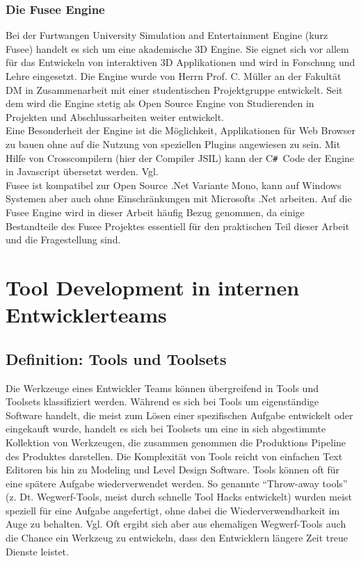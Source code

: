 \documentclass[pagesize, paper=a4, fontsize=12pt, titlepage=true, headings=small, headnosepline, abstractoff, liststotoc, nochapterprefix, plainheadsepline, twoside]{scrreprt}
\newcommand{\CSS}{C\texttt{\# }}
\begin{document}
\subsection{Die Fusee Engine}
Bei der Furtwangen University Simulation and Entertainment Engine (kurz Fusee) handelt es sich um eine akademische 3D Engine. Sie eignet sich vor allem für das Entwickeln von interaktiven 3D Applikationen und wird in Forschung und Lehre eingesetzt. Die Engine wurde von Herrn Prof. C. Müller an der Fakultät DM in Zusammenarbeit mit einer studentischen Projektgruppe entwickelt. Seit dem wird die Engine stetig als Open Source Engine von Studierenden in Projekten und Abschlussarbeiten weiter entwickelt.\\

Eine Besonderheit der Engine ist die Möglichkeit, Applikationen für Web Browser zu bauen ohne auf die Nutzung von speziellen Plugins angewiesen zu sein. Mit Hilfe von Crosscompilern (hier der Compiler JSIL) kann der \CSS Code der Engine in Javascript übersetzt werden. Vgl.  \\

Fusee ist kompatibel zur Open Source .Net Variante Mono, kann auf Windows Systemen aber auch ohne Einschränkungen mit Microsofts .Net arbeiten. Auf die Fusee Engine wird in dieser Arbeit häufig Bezug genommen, da einige Bestandteile des Fusee Projektes essentiell für den praktischen Teil dieser Arbeit und die Fragestellung sind.



\chapter{Tool Development in internen Entwicklerteams}

\section{Definition: Tools und Toolsets}
Die Werkzeuge eines Entwickler Teams können übergreifend in Tools und Toolsets klassifiziert werden. Während es sich bei Tools um eigenständige Software handelt, die meist zum Lösen einer spezifischen Aufgabe entwickelt oder eingekauft wurde, handelt es sich bei Toolsets um eine in sich abgestimmte Kollektion von Werkzeugen, die zusammen genommen die Produktions Pipeline des Produktes darstellen. Die Komplexität von Tools reicht von einfachen Text Editoren bis hin zu Modeling und Level Design Software.
Tools können oft für eine spätere Aufgabe wiederverwendet werden. So genannte “Throw-away tools” (z. Dt. Wegwerf-Tools, meist durch schnelle Tool Hacks entwickelt) wurden meist speziell für eine Aufgabe angefertigt, ohne dabei die Wiederverwendbarkeit im Auge zu behalten. Vgl. \autocite[S. 3]{Wihlidal2006}
Oft ergibt sich aber aus ehemaligen Wegwerf-Tools auch die Chance ein Werkzeug zu entwickeln, dass den Entwicklern längere Zeit treue Dienste leistet.
\end{document}

